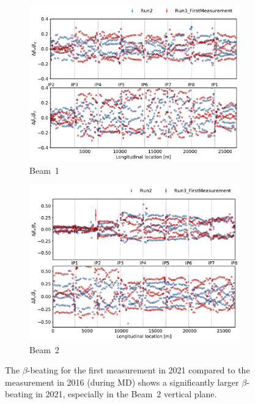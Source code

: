 \documentclass[a4paper]{cernatsnote}
\begin{document}
\begin{figure}[ht]
\begin{subfigure}{.5\textwidth}
  \centering
  \includegraphics[width=.99\linewidth]{plots/beam1/beta_beat_virgin_2016_2021.pdf}  
  \caption{Beam~1}
\end{subfigure}
\begin{subfigure}{.5\textwidth}
  \centering
  \includegraphics[width=.99\linewidth]{plots/beam2/B2_BetaBeat_2016_vs_first2021.pdf}  
  \caption{Beam~2}
\end{subfigure}
\caption{The $\beta$-beating for the first measurement in 2021 compared to the measurement in 2016 (during MD) shows a significantly larger $\beta$-beating in 2021, especially in the Beam~2 vertical plane.}
\label{fig:initalVs2016}
\end{figure}
\end{document}
